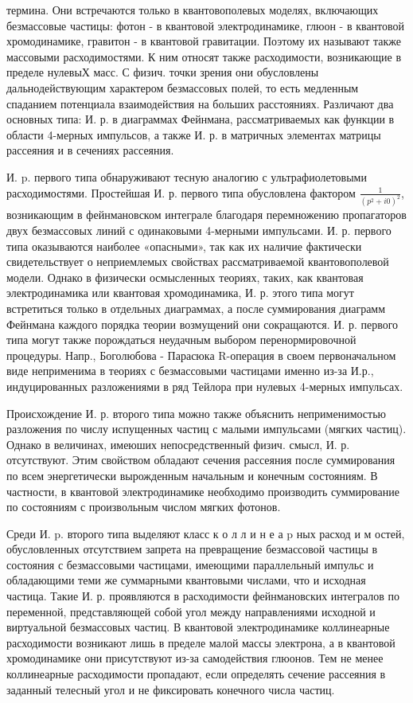 \documentclass[10pt]{article}
\begin{document}
термина. Они встречаются только в квантовополевых моделях, включающих безмассовые частицы: фотон - в квантовой электродинамике, глюон - в квантовой хромодинамике, гравитон - в квантовой гравитации. Поэтому их называют также массовыми расходимостями. К ним относят также расходимости, возникающие в пределе нулевыХ масс. С физич. точки зрения они обусловлены дальнодействующим характером безмассовых полей, то есть медленным спаданием потенциала взаимодействия на больших расстояниях. Различают два основных типа: И. р. в диаграммах Фейнмана, рассматриваемых как функции в области 4-мерных импульсов, а также И. р. в матричных элементах матрицы рассеяния и в сечениях рассеяния.



И. p. первого типа обнаруживают тесную аналогию с ультрафиолетовыми расходимостями. Простейшая И. р. первого типа обусловлена фактором $\frac{1}{\left(p^{2}+i 0\right)^{2}}$, возникающим в фейнмановском интеграле благодаря перемножению пропагаторов двух безмассовых линий с одинаковыми 4-мерными импульсами. И. р. первого типа оказываются наиболее «опасными», так как их наличие фактически свидетельствует о неприемлемых свойствах рассматриваемой квантовополевой модели. Однако в физически осмысленных теориях, таких, как квантовая электродинамика или квантовая хромодинамика, И. р. этого типа могут встретиться только в отдельных диаграммах, а после суммирования диаграмм Фейнмана каждого порядка теории возмущений они сокращаются. И. р. первого типа могут также порождаться неудачным выбором перенормировочной процедуры. Напр., Боголюбова - Парасюка R-операция в своем первоначальном виде неприменима в теориях с безмассовыми частицами именно из-за И.р., индуцированных разложениями в ряд Тейлора при нулевых 4-мерных импульсах.



Происхождение И. р. второго типа можно также объяснить неприменимостью разложения по числу испущенных частиц с малыми импульсами (мягких частиц). Однако в величинах, имеюших непосредственный физич. смысл, И. р. отсутствуют. Этим свойством обладают сечения рассеяния после суммирования по всем энергетически вырожденным начальным и конечным состояниям. В частности, в квантовой электродинамике необходимо производить суммирование по состояниям с произвольным числом мягких фотонов.



Среди И. p. второго типа выделяют класс к о л л и н е а p ных расход и м остей, обусловленных отсутствием запрета на превращение безмассовой частицы в состояния с безмассовыми частицами, имеющими параллельный импульс и обладающими теми же суммарными квантовыми числами, что и исходная частица. Такие И. р. проявляются в расходимости фейнмановских интегралов по переменной, представляющей собой угол между направлениями исходной и виртуальной безмассовых частиц. В квантовой электродинамике коллинеарные расходимости возникают лишь в пределе малой массы электрона, а в квантовой хромодинамике они присутствуют из-за самодействия глюонов. Тем не менее коллинеарные расходимости пропадают, если определять сечение рассеяния в заданный телесный угол и не фиксировать конечного числа частиц.
\end{document}
